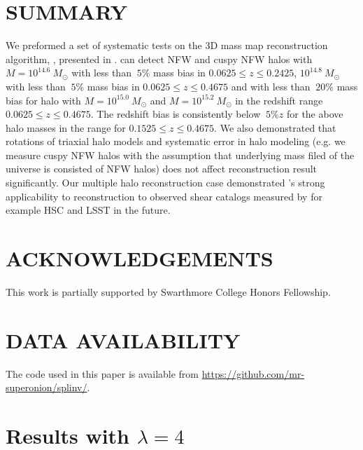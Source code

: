 \documentclass[twocolumn, usenames, dvipsnames]{aastex63}
\begin{document}
\section{SUMMARY}
\label{sec:Sum}
We preformed a set of systematic tests on the 3D mass map reconstruction
algorithm, \splinv{}, presented in \cite{massmap_Li2021}. \splinv{} can detect
NFW and cuspy NFW halos with $M = 10^{14.6}~M_\odot$ with less than $~5\%$ mass
bias in $0.0625\leq z \leq 0.2425$, $10^{14.8}~M_\odot$ with less than $~5\%$
mass bias in $0.0625\leq z \leq 0.4675$ and with less than $~20\%$ mass bias
for halo with $M= 10^{15.0} ~M_\odot$ and $M=10^{15.2}~M_\odot$ in the redshift
range $0.0625\leq z \leq 0.4675$. The redshift bias is consistently below $~5\%
z$ for the above halo masses in the range for $0.1525\leq z \leq 0.4675$. We
also demonstrated that rotations of triaxial halo models and systematic error
in halo modeling (e.g. we measure cuspy NFW halos with the assumption that
underlying mass filed of the universe is consisted of NFW halos) does not
affect reconstruction result significantly. Our multiple halo reconstruction
case demonstrated \splinv{}'s strong applicability to reconstruction to
observed shear catalogs measured by for example HSC and LSST in the future.

\section*{ACKNOWLEDGEMENTS}
This work is partially supported by Swarthmore College Honors Fellowship.


\section*{DATA AVAILABILITY}

The code used in this paper is available from
\url{https://github.com/mr-superonion/splinv/}.




\appendix

\section{Results with $\lambda=4$}\label{lambda=4,append}

\end{document}
